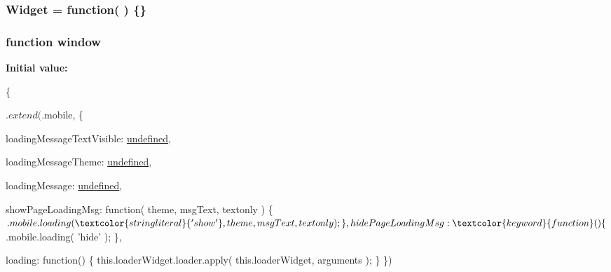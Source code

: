 \hypertarget{jquery_8mobile-1_83_81_8js_afc4c2169b499b3ea4e8c3e0924a3df4f}{
\subsubsection[{Widget}]{\setlength{\rightskip}{0pt plus 5cm}Widget = function( ) \{\}}}\label{jquery_8mobile-1_83_81_8js_afc4c2169b499b3ea4e8c3e0924a3df4f}
\hypertarget{jquery_8mobile-1_83_81_8js_ad55530ae1e5978df8e721017c1fc8466}{
\subsubsection[{window}]{\setlength{\rightskip}{0pt plus 5cm}function window}}\label{jquery_8mobile-1_83_81_8js_ad55530ae1e5978df8e721017c1fc8466}
{\bfseries Initial value\+:}
\begin{DoxyCode}
\{
    
    
    $.extend( $.mobile, \{
        
        loadingMessageTextVisible: \hyperlink{jquery_8mobile-1_83_81_8js_a08113a236cc18d2a9d5ce27e638012be}{undefined},

        
        loadingMessageTheme: \hyperlink{jquery_8mobile-1_83_81_8js_a08113a236cc18d2a9d5ce27e638012be}{undefined},

        
        loadingMessage: \hyperlink{jquery_8mobile-1_83_81_8js_a08113a236cc18d2a9d5ce27e638012be}{undefined},

        
        
        
        
        showPageLoadingMsg: \textcolor{keyword}{function}( theme, msgText, textonly ) \{
            $.mobile.loading( \textcolor{stringliteral}{'show'}, theme, msgText, textonly );
        \},

        
        hidePageLoadingMsg: \textcolor{keyword}{function}() \{
            $.mobile.loading( \textcolor{stringliteral}{'hide'} );
        \},

        loading: \textcolor{keyword}{function}() \{
            this.loaderWidget.loader.apply( this.loaderWidget, arguments );
        \}
    \})
\end{DoxyCode}
